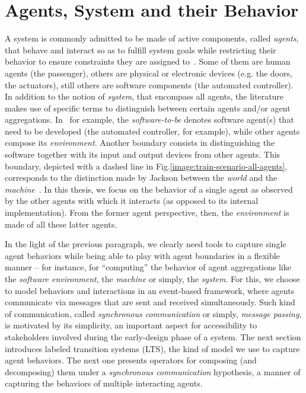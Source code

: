 \section{Agents, System and their Behavior}

A system is commonly admitted to be made of active components, called \emph{agents}, that behave and interact so as to fulfill system goals while restricting their behavior to ensure constraints they are assigned to~\cite{Feather:1987}. Some of them are human agents (the passenger), others are physical or electronic devices (e.g. the doors, the actuators), still others are software components (the automated controller). In addition to the notion of \emph{system}, that encompass all agents, the literature makes use of specific terms to distinguish between certain agents and/or agent aggregations. In~\cite{VanLamsweerde:2009} for example, the \emph{software-to-be} denotes software agent(s) that need to be developed (the automated controller, for example), while other agents compose its \emph{environment}. Another boundary consists in distinguishing the software together with its input and output devices from other agents. This boundary, depicted with a dashed line in Fig.\ref{image:train-scenario-all-agents}, corresponds to the distinction made by Jackson between the \emph{world} and the \emph{machine}~\cite{Jackson:1995}. In this thesis, we focus on the behavior of a single agent as observed by the other agents with which it interacts (as opposed to its internal implementation). From the former agent perspective, then, the \emph{environment} is made of all these latter agents. 

In the light of the previous paragraph, we clearly need tools to capture single agent behaviors while being able to play with agent boundaries in a flexible manner -- for instance, for ``computing'' the behavior of agent aggregations like the \emph{software environment}, the \emph{machine} or simply, the \emph{system}. For this, we choose to model behaviors and interactions in an event-based framework, where agents communicate via messages that are sent and received simultaneously. Such kind of communication, called \emph{synchronous communication} or simply, \emph{message passing}, is motivated by its simplicity, an important aspect for accessibility to stakeholders involved during the early-design phase of a system. The next section introduces  labeled transition systems (LTS), the kind of model we use to capture agent behaviors. The next one presents operators for composing (and decomposing) them under a \emph{synchronous communication} hypothesis, a manner of capturing the behaviors of multiple interacting agents.

